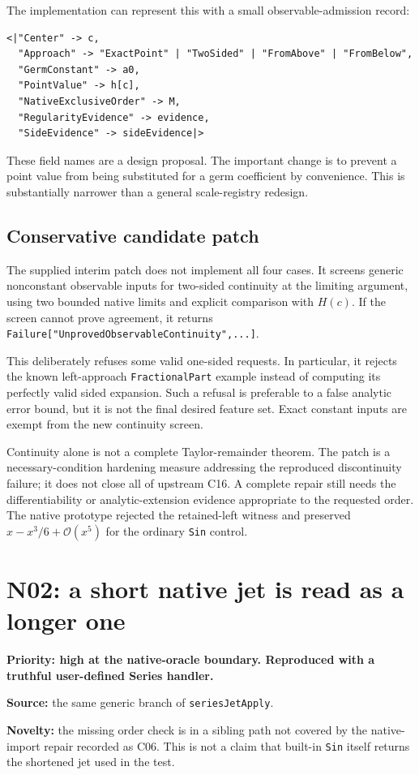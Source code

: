 \documentclass[11pt,letterpaper]{article}
\newcommand{\code}[1]{\nolinkurl{#1}}
\newcommand{\OO}{\mathcal{O}}
\begin{document}
The implementation can represent this with a small observable-admission record:
\begin{lstlisting}
<|"Center" -> c,
  "Approach" -> "ExactPoint" | "TwoSided" | "FromAbove" | "FromBelow",
  "GermConstant" -> a0,
  "PointValue" -> h[c],
  "NativeExclusiveOrder" -> M,
  "RegularityEvidence" -> evidence,
  "SideEvidence" -> sideEvidence|>
\end{lstlisting}
These field names are a design proposal. The important change is to prevent a
point value from being substituted for a germ coefficient by convenience.
This is substantially narrower than a general scale-registry redesign.

\subsection{Conservative candidate patch}
The supplied interim patch does not implement all four cases. It screens generic
nonconstant observable inputs for two-sided continuity at the limiting argument,
using two bounded native limits and explicit comparison with $H(c)$. If the
screen cannot prove agreement, it returns
\code{Failure["UnprovedObservableContinuity",...]}.

This deliberately refuses some valid one-sided requests. In particular, it
rejects the known left-approach \code{FractionalPart} example instead of computing
its perfectly valid sided expansion. Such a refusal is preferable to a false
analytic error bound, but it is not the final desired feature set. Exact
constant inputs are exempt from the new continuity screen.

Continuity alone is not a complete Taylor-remainder theorem. The patch is a
necessary-condition hardening measure addressing the reproduced discontinuity
failure; it does not close all of upstream C16. A complete repair still needs
the differentiability or analytic-extension evidence appropriate to the requested
order. The native prototype rejected the retained-left witness and preserved
$x-x^3/6+\OO(x^5)$ for the ordinary \code{Sin} control.

\section{N02: a short native jet is read as a longer one}\label{sec:n02}
\begin{findingbox}
\textbf{Priority: high at the native-oracle boundary. Reproduced with a truthful
user-defined Series handler.}\par
\textbf{Source:} the same generic branch of \code{seriesJetApply}.\par
\textbf{Novelty:} the missing order check is in a sibling path not covered by the
native-import repair recorded as C06. This is not a claim that built-in
\code{Sin} itself returns the shortened jet used in the test.
\end{findingbox}
\end{document}
